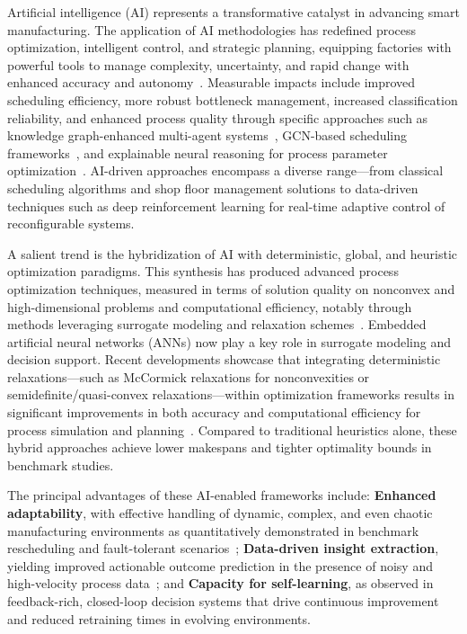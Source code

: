 \documentclass[sigconf]{acmart}
\begin{document}
Artificial intelligence (AI) represents a transformative catalyst in advancing smart manufacturing. The application of AI methodologies has redefined process optimization, intelligent control, and strategic planning, equipping factories with powerful tools to manage complexity, uncertainty, and rapid change with enhanced accuracy and autonomy~\cite{ref2,ref6,ref13,ref14,ref19,ref20,ref27,ref30,ref37,ref38,ref41,ref42,ref44,ref45,ref50,ref52,ref56,ref72,ref91}. Measurable impacts include improved scheduling efficiency, more robust bottleneck management, increased classification reliability, and enhanced process quality through specific approaches such as knowledge graph-enhanced multi-agent systems~\cite{ref13}, GCN-based scheduling frameworks~\cite{ref14}, and explainable neural reasoning for process parameter optimization~\cite{ref20}. AI-driven approaches encompass a diverse range—from classical scheduling algorithms and shop floor management solutions to data-driven techniques such as deep reinforcement learning for real-time adaptive control of reconfigurable systems.

A salient trend is the hybridization of AI with deterministic, global, and heuristic optimization paradigms. This synthesis has produced advanced process optimization techniques, measured in terms of solution quality on nonconvex and high-dimensional problems and computational efficiency, notably through methods leveraging surrogate modeling and relaxation schemes~\cite{ref71,ref72,ref73,ref76,ref78}. Embedded artificial neural networks (ANNs) now play a key role in surrogate modeling and decision support. Recent developments showcase that integrating deterministic relaxations—such as McCormick relaxations for nonconvexities or semidefinite/quasi-convex relaxations—within optimization frameworks results in significant improvements in both accuracy and computational efficiency for process simulation and planning~\cite{ref71,ref72,ref73,ref76,ref78}. Compared to traditional heuristics alone, these hybrid approaches achieve lower makespans and tighter optimality bounds in benchmark studies.

The principal advantages of these AI-enabled frameworks include: \textbf{Enhanced adaptability}, with effective handling of dynamic, complex, and even chaotic manufacturing environments as quantitatively demonstrated in benchmark rescheduling and fault-tolerant scenarios~\cite{ref13,ref19}; \textbf{Data-driven insight extraction}, yielding improved actionable outcome prediction in the presence of noisy and high-velocity process data~\cite{ref20,ref50,ref52}; and \textbf{Capacity for self-learning}, as observed in feedback-rich, closed-loop decision systems that drive continuous improvement and reduced retraining times in evolving environments.
\end{document}
